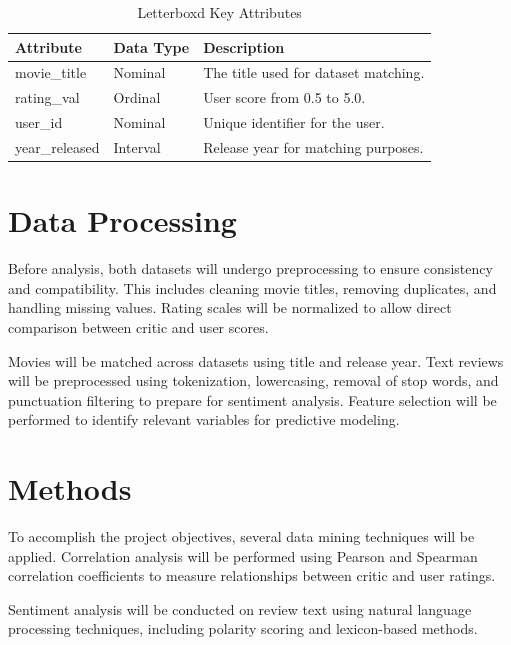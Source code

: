 \documentclass[conference]{IEEEtran}
\begin{document}
\begin{table}[htbp]
  \centering
  \caption{Letterboxd Key Attributes}
  \label{table:letterboxd}
  \begin{tabularx}{\columnwidth}{|l|l|X|}
    \hline
    \textbf{Attribute} & \textbf{Data Type} & \textbf{Description}                 \\ \hline
    movie\_title       & Nominal            & The title used for dataset matching. \\ \hline
    rating\_val        & Ordinal            & User score from 0.5 to 5.0.          \\ \hline
    user\_id           & Nominal            & Unique identifier for the user.      \\ \hline
    year\_released     & Interval           & Release year for matching purposes.  \\ \hline
  \end{tabularx}
\end{table}

\section{Data Processing}

Before analysis, both datasets will undergo preprocessing to ensure
consistency and compatibility. This includes cleaning movie titles,
removing duplicates, and handling missing values. Rating scales will
be normalized to allow direct comparison between critic and user scores.

Movies will be matched across datasets using title and release year.
Text reviews will be preprocessed using tokenization, lowercasing,
removal of stop words, and punctuation filtering to prepare for
sentiment analysis. Feature selection will be performed to identify
relevant variables for predictive modeling.

\section{Methods}

To accomplish the project objectives, several data mining techniques
will be applied. Correlation analysis will be performed using Pearson
and Spearman correlation coefficients to measure relationships between
critic and user ratings.

Sentiment analysis will be conducted on review text using natural
language processing techniques, including polarity scoring and
lexicon-based methods.
\end{document}
